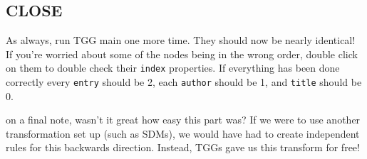 \newpage
\hypertarget{m2tClose}{}
\subsection{CLOSE}
\genHeader

As always, run TGG main one more time. They should now be nearly identical! If you're worried about some of the nodes being in the wrong order, double click on
them to double check their \texttt{index} properties. If everything has been done correctly every \texttt{entry} should be 2, each \texttt{author} should be 1,
and \texttt{title} should be 0.

on a final note, wasn't it great how easy this part was? If we were to use another transformation set up (such as SDMs), we would have had to create independent
rules for this backwards direction. Instead, TGGs gave us this transform for free!
